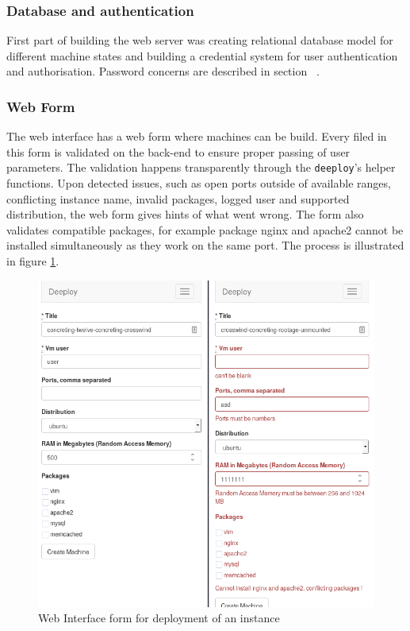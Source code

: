 \documentclass{article}
\begin{document}
\subsubsection{Database and authentication}
First part of building the web server was creating relational database model for different machine states and building a credential system for user authentication and authorisation. Password concerns are described in section ~.

\subsubsection{Web Form}
The web interface has a web form where machines can be build. Every filed in this form is validated on the back-end to ensure proper passing of user parameters. The validation happens transparently through the \texttt{deeploy}'s helper functions. Upon detected issues, such as open ports outside of available ranges, conflicting instance name, invalid packages, logged user and supported distribution, the web form gives hints of what went wrong. The form also validates compatible packages, for example package nginx and apache2 cannot be installed simultaneously as they work on the same port. The process is illustrated in figure \ref{fig:valid-invalid-form}. 

\begin{figure}[h!]
	\vspace{0.5cm}
	\includegraphics[width=12cm]{valid_invalid_form.png}
	\vspace{0.5cm}
	\caption{Web Interface form for deployment of an instance}
	\label{fig:valid-invalid-form}
\end{figure}
\end{document}
